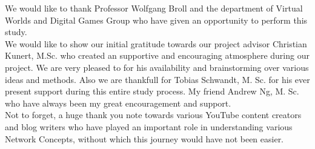 \documentclass[
11pt, %
english, %
singlespacing, %
headsepline, %
]{mediaproject} %
\begin{document}

\begin{acknowledgements}
\addchaptertocentry{\acknowledgementname} %
We would like to thank Professor Wolfgang Broll and the department of Virtual Worlds and Digital Games Group who have given an opportunity to perform this study.\\

We would like to show our initial gratitude towards our project advisor Christian Kunert, M.Sc. who created an supportive and encouraging atmosphere during our project. We are very pleased to for his availability and brainstorming over various ideas and methods. Also we are thankfull for Tobias Schwandt, M. Sc. for his ever present support during this entire study process. My friend Andrew Ng, M. Sc. who have always been my great encouragement and support.\\

Not to forget, a huge thank you note towards various YouTube content creators and blog writers who have played an important role in understanding various Network Concepts, without which this journey would have not been easier. 


\end{acknowledgements}


\tableofcontents %

\listoffigures %

\listoftables %



%
\end{document}
